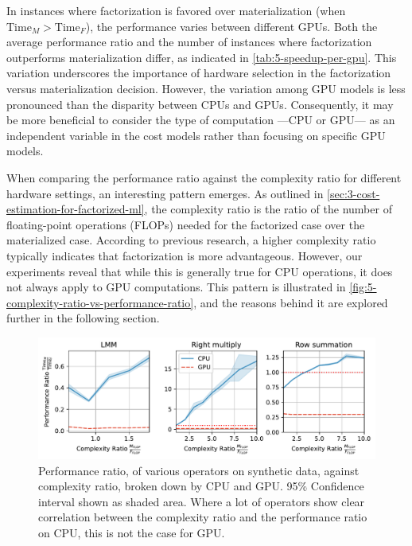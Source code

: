 In instances where factorization is favored over materialization (when $\text{Time}_M > \text{Time}_F$), the performance varies between different GPUs. Both the average performance ratio and the number of instances where factorization outperforms materialization differ, as indicated in \autoref{tab:5-speedup-per-gpu}. This variation underscores the importance of hardware selection in the factorization versus materialization decision. However, the variation among GPU models is less pronounced than the disparity between CPUs and GPUs. Consequently, it may be more beneficial to consider the type of computation —CPU or GPU— as an independent variable in the cost models rather than focusing on specific GPU models.

When comparing the performance ratio against the complexity ratio for different hardware settings, an interesting pattern emerges. As outlined in \autoref{sec:3-cost-estimation-for-factorized-ml}, the complexity ratio is the ratio of the number of floating-point operations (FLOPs) needed for the factorized case over the materialized case. According to previous research, a higher complexity ratio typically indicates that factorization is more advantageous. However, our experiments reveal that while this is generally true for CPU operations, it does not always apply to GPU computations. This pattern is illustrated in \autoref{fig:5-complexity-ratio-vs-performance-ratio}, and the reasons behind it are explored further in the following section.

\begin{figure}[ht]
    \centering
    \includegraphics[width=\linewidth]{chapters/05_cost_estimation/figures/motivation_speedup_complexity_ratio.pdf}
    \caption[Performance ratio plotted against complexity ratio]{Performance ratio, of various operators on synthetic data, against complexity ratio, broken down by CPU and GPU. 95\% Confidence interval shown as shaded area. Where a lot of operators show clear correlation between the complexity ratio and the performance ratio on CPU, this is not the case for GPU.}
    \label{fig:5-complexity-ratio-vs-performance-ratio}
\end{figure}


